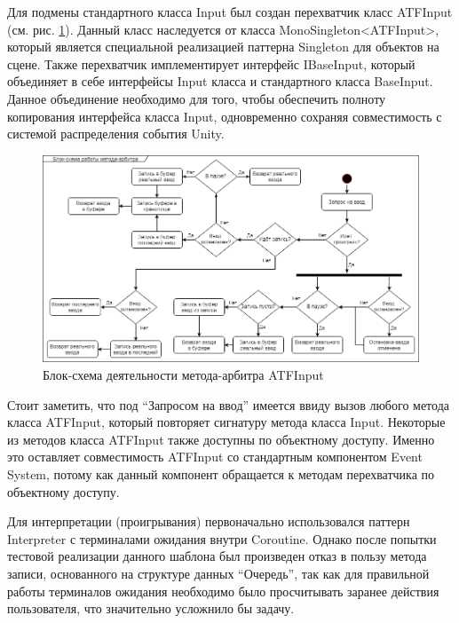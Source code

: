 Для подмены стандартного класса Input был создан перехватчик класс ATFInput (см. рис. \ref{atfInput}). Данный класс наследуется от класса MonoSingleton<ATFInput>, который является специальной реализацией паттерна Singleton для объектов на сцене. Также перехватчик имплементирует интерфейс IBaseInput, который объединяет в себе интерфейсы Input класса и стандартного класса BaseInput. Данное объединение необходимо для того, чтобы обеспечить полноту копирования интерфейса класса Input, одновременно сохраняя совместимость с системой распределения события Unity. 

\begin{figure}[H]
	\centering
	\includegraphics[width=\linewidth]{rofior_diagram.png}
	\caption{Блок-схема деятельности метода-арбитра ATFInput}
	\label{atfInput}
\end{figure}

Стоит заметить, что под ``Запросом на ввод'' имеется ввиду вызов любого метода класса ATFInput, который повторяет сигнатуру метода класса Input. Некоторые из методов класса ATFInput также доступны по объектному доступу. Именно это оставляет совместимость ATFInput со стандартным компонентом Event System, потому как данный компонент обращается к методам перехватчика по объектному доступу.

Для интерпретации (проигрывания) первоначально использовался паттерн Interpreter с терминалами ожидания внутри Coroutine. Однако после попытки тестовой реализации данного шаблона был произведен отказ в пользу метода записи, основанного на структуре данных ``Очередь'', так как для правильной работы терминалов ожидания необходимо было просчитывать заранее действия пользователя, что значительно усложнило бы задачу.